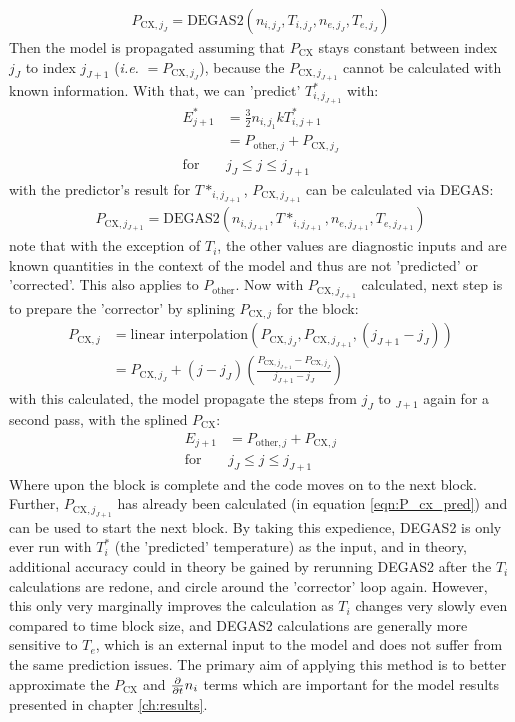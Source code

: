\begin{align}
    P_{\text{CX},{j_J}} = \text{DEGAS2}(n_{i,j_J},T_{i,j_J}, n_{e,j_J}, T_{e,j_J})
\end{align}
Then the model is propagated assuming that $P_{\text{CX}}$ stays constant between index $j_J$ to index $j_{J+1}$ (\textit{i.e. }$ = P_{\text{CX}, j_J}$), because the $P_{\text{CX}, j_{J+1}}$ cannot be calculated with known information. With that, we can 'predict' $T^*_{i,j_{J+1}}$ with:
\begin{align}
    E^*_{j+1} & = \frac{3}{2}n_{i,j_1}kT_{i,j+1}^*\\
    & = P_{\text{other}, j} + P_{\text{CX}, j_J}\\
    \text{for } &j_J \leq j \leq j_{J+1}
\end{align}
with the predictor's result for $T*_{i, j_{J+1}}$, $P_{\text{CX}, j_{J+1}}$ can be calculated via DEGAS:
\begin{align}
    P_{\text{CX},{j_{J+1}}} = \text{DEGAS2}(n_{i,j_{J+1}},T*_{i,j_{J+1}}, n_{e,j_{J+1}}, T_{e,j_{J+1}})\label{eqn:P_cx_pred}
\end{align}
note that with the exception of $T_i$, the other values are diagnostic inputs and are known quantities in the context of the model and thus are not 'predicted' or 'corrected'. This also applies to $P_{\text{other}}$. Now with $P_{\text{CX}, j_{J+1}}$ calculated, next step is to prepare the 'corrector' by splining $P_{\text{CX}, j}$ for the block:
\begin{align}
    P_{\text{CX}, j} &= \text{linear interpolation}(P_{\text{CX},{j_J}}, P_{\text{CX}, j_{J+1}}, (j_{J+1} - j_J) )\\
    &= P_{\text{CX},{j_J}} + (j - j_J)(\frac{P_{\text{CX}, j_{J+1}} - P_{\text{CX},{j_J}}}{j_{J+1} - j_J})
\end{align}
with this calculated, the model propagate the steps from $j_J$ to $_{J+1}$ again for a second pass, with the splined $P_{\text{CX}}$:
\begin{align}
    E_{j+1} & = P_{\text{other}, j} + P_{\text{CX}, j}\\
    \text{for } &j_J \leq j \leq j_{J+1}
\end{align}
Where upon the block is complete and the code moves on to the next block. Further, $P_{\text{CX},{j_{J+1}}}$ has already been calculated (in equation \ref{eqn:P_cx_pred}) and can be used to start the next block. By taking this expedience, DEGAS2 is only ever run with $T_i^*$ (the 'predicted' temperature) as the input, and in theory, additional accuracy could in theory be gained by rerunning DEGAS2 after the $T_i$ calculations are redone, and circle around the 'corrector' loop again. However, this only very marginally improves the calculation as $T_i$ changes very slowly even compared to time block size, and DEGAS2 calculations are generally more sensitive to $T_e$, which is an external input to the model and does not suffer from the same prediction issues. The primary aim of applying this method is to better approximate the $P_\text{CX}$ and $\frac{\partial}{\partial t} n_i$ terms which are important for the model results presented in chapter \ref{ch:results}.

